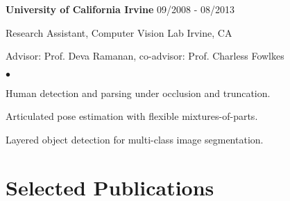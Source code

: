 \documentclass[margin]{res3}
\newenvironment{list1}{
  \begin{list}{\ding{113}}{%
      \setlength{\itemsep}{0.03in}
      \setlength{\parsep}{0in} \setlength{\parskip}{0in}
      \setlength{\topsep}{0in} \setlength{\partopsep}{0in}
      \setlength{\leftmargin}{0in}}}{\end{list}}
\newenvironment{list2}{
  \begin{list}{$\bullet$}{%
      \setlength{\itemsep}{0.02in}
      \setlength{\parsep}{0in} \setlength{\parskip}{0in}
      \setlength{\topsep}{0in} \setlength{\partopsep}{0in}
      \setlength{\leftmargin}{0.2in}}}{\end{list}}
\begin{document}
\begin{resume}
\begin{list1}
\item[] {\bf University of California Irvine} \hfill {09/2008 - 08/2013}
\vspace{-2pt}
\item[] Research Assistant, Computer Vision Lab \hfill {Irvine, CA}
\vspace{-2pt}
\item[] Advisor: Prof. Deva Ramanan, co-advisor: Prof. Charless Fowlkes

\begin{list2}
\item Human detection and parsing under occlusion and truncation.
\vspace{-2pt}
\item Articulated pose estimation with flexible mixtures-of-parts.
\vspace{-2pt}
\item Layered object detection for multi-class image segmentation.
\end{list2}
\vspace{5pt}


 

\end{list1}

\section{\sc Selected Publications}
\begin{list1}


\end{list1}
\end{resume}
\end{document}
